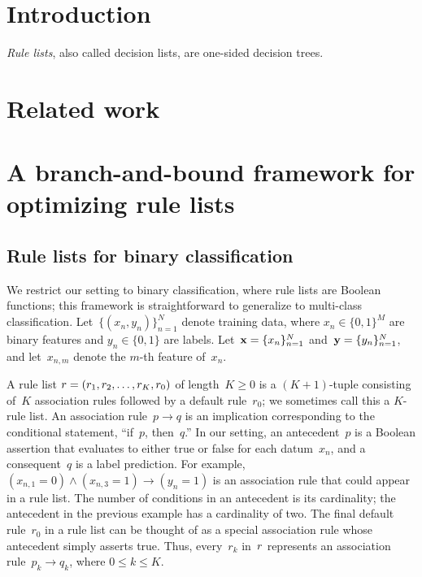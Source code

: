 \section{Introduction}

\emph{Rule lists}, also called decision lists, are one-sided decision trees.

\section{Related work}

\citep{rivest:1987}

\citep{LethamRuMcMa15}

\citep{YangRuSe16}

\citep{garofalakis:2000-kdd,garofalakis:2000-sigkdd,garofalakis:2003}

\section{A branch-and-bound framework for optimizing rule lists}

\subsection{Rule lists for binary classification}
\label{sec:setup}

We restrict our setting to binary classification,
where rule lists are Boolean functions;
this framework is straightforward to generalize to multi-class classification.
%
Let~${\{(x_n, y_n)\}_{n=1}^N}$ denote training data,
where ${x_n \in \{0, 1\}^M}$ are binary features and ${y_n \in \{0, 1\}}$ are labels.
%
Let~${\mathbf{x} = \{x_n\}_{n=1}^N}$ and~${\mathbf{y} = \{y_n\}_{n=1}^N}$,
and let~${x_{n,m}}$ denote the $m$-th feature of~$x_n$.

A rule list ${{r} = (r_1, r_2, \dots, r_K, r_0)}$ of length~${K \ge 0}$ is a
${(K+1)}$-tuple consisting of~$K$ association rules followed by a default rule~$r_0$;
we sometimes call this a $K$-rule list.
%
An association rule~${p \rightarrow q}$ is an implication corresponding to the
conditional statement, ``if~$p$, then~$q$.''
%
In our setting, an antecedent~$p$ is a Boolean assertion that evaluates to either
true or false for each datum~$x_n$, and a consequent~$q$ is a label prediction.
%
For example,~${(x_{n, 1} = 0) \wedge (x_{n, 3} = 1) \rightarrow (y_n = 1)}$
is an association rule that could appear in a rule list.
%
The number of conditions in an antecedent is its cardinality;
the antecedent in the previous example has a cardinality of two.
%
The final default rule~$r_0$ in a rule list can be thought of as a special
association rule whose antecedent simply asserts true.
%
Thus, every~$r_k$ in~${r}$ represents an association rule~${p_k \rightarrow q_k}$,
where ${0 \le k\le K}$.

